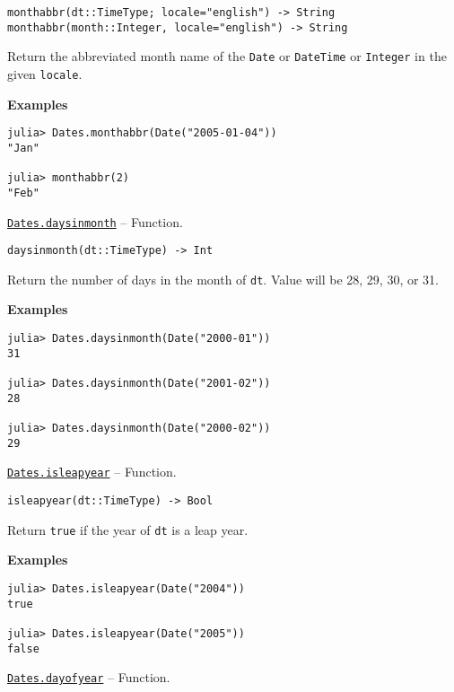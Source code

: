 \begin{adjustwidth}{2em}{0pt}


\begin{verbatim}
monthabbr(dt::TimeType; locale="english") -> String
monthabbr(month::Integer, locale="english") -> String
\end{verbatim}

Return the abbreviated month name of the \texttt{Date} or \texttt{DateTime} or \texttt{Integer} in the given \texttt{locale}.

\textbf{Examples}


\begin{verbatim}
julia> Dates.monthabbr(Date("2005-01-04"))
"Jan"

julia> monthabbr(2)
"Feb"
\end{verbatim}



\end{adjustwidth}
\hypertarget{7867088328366678414}{} 
\hyperlink{7867088328366678414}{\texttt{Dates.daysinmonth}}  -- {Function.}

\begin{adjustwidth}{2em}{0pt}


\begin{verbatim}
daysinmonth(dt::TimeType) -> Int
\end{verbatim}

Return the number of days in the month of \texttt{dt}. Value will be 28, 29, 30, or 31.

\textbf{Examples}


\begin{verbatim}
julia> Dates.daysinmonth(Date("2000-01"))
31

julia> Dates.daysinmonth(Date("2001-02"))
28

julia> Dates.daysinmonth(Date("2000-02"))
29
\end{verbatim}



\end{adjustwidth}
\hypertarget{8386083064240039655}{} 
\hyperlink{8386083064240039655}{\texttt{Dates.isleapyear}}  -- {Function.}

\begin{adjustwidth}{2em}{0pt}


\begin{verbatim}
isleapyear(dt::TimeType) -> Bool
\end{verbatim}

Return \texttt{true} if the year of \texttt{dt} is a leap year.

\textbf{Examples}


\begin{verbatim}
julia> Dates.isleapyear(Date("2004"))
true

julia> Dates.isleapyear(Date("2005"))
false
\end{verbatim}



\end{adjustwidth}
\hypertarget{4496651838489546625}{} 
\hyperlink{4496651838489546625}{\texttt{Dates.dayofyear}}  -- {Function.}

